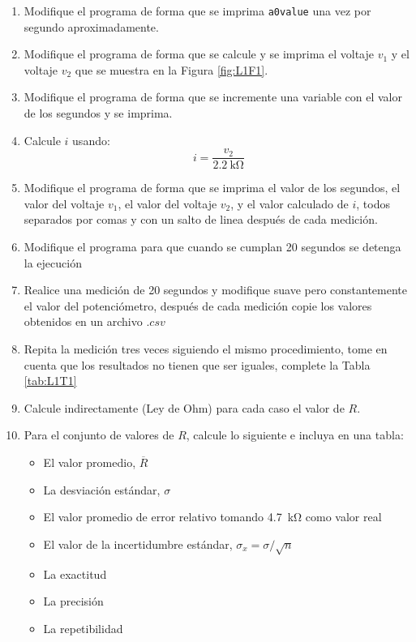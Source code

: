 \begin{enumerate}
\item Modifique el programa de forma que se imprima \lstinline{a0value} una vez por segundo aproximadamente.
\item Modifique el programa de forma que se calcule y se imprima el voltaje $v_1$ y el voltaje $v_2$ que se muestra en la Figura \ref{fig:L1F1}.
\item Modifique el programa de forma que se incremente una variable con el valor de los segundos y se imprima.
\item Calcule $i$ usando:
\begin{equation*}
    i = \dfrac{v_2}{\SI{2.2}{\kilo\ohm}}
\end{equation*}
\item Modifique el programa de forma que se imprima el valor de los segundos, el valor del voltaje $v_1$, el valor del voltaje $v_2$, y el valor calculado de $i$, todos separados por comas y con un salto de linea después de cada medición.
\item Modifique el programa para que cuando se cumplan 20 segundos se detenga la ejecución
\item Realice una medición de 20 segundos y modifique suave pero constantemente el valor del potenciómetro, después de cada medición copie los valores obtenidos en un archivo $.csv$
\item Repita la medición tres veces siguiendo el mismo procedimiento, tome en cuenta que los resultados no tienen que ser iguales, complete la Tabla \ref{tab:L1T1}
\item Calcule indirectamente (Ley de Ohm) para cada caso el valor de $R$.
\item Para el conjunto de valores de $R$, calcule lo siguiente e incluya en una tabla:
    \begin{itemize}
        \item El valor promedio, $\overline{R}$ 
        \item La desviación estándar, $\sigma$
        \item El valor promedio de error relativo tomando \SI{4.7}{\kilo\ohm} como valor real
        \item El valor de la incertidumbre estándar, $\sigma_x = \sigma / \sqrt{n}$
        \item La exactitud
        \item La precisión
        \item La repetibilidad
    \end{itemize}
    

\end{enumerate}
